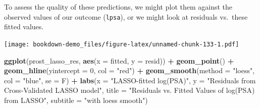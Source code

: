 \documentclass[]{book}
\newenvironment{Shaded}{\begin{snugshade}}{\end{snugshade}}
\newcommand{\KeywordTok}[1]{\textcolor[rgb]{0.13,0.29,0.53}{\textbf{#1}}}
\newcommand{\DataTypeTok}[1]{\textcolor[rgb]{0.13,0.29,0.53}{#1}}
\newcommand{\DecValTok}[1]{\textcolor[rgb]{0.00,0.00,0.81}{#1}}
\newcommand{\StringTok}[1]{\textcolor[rgb]{0.31,0.60,0.02}{#1}}
\newcommand{\OperatorTok}[1]{\textcolor[rgb]{0.81,0.36,0.00}{\textbf{#1}}}
\newcommand{\NormalTok}[1]{#1}
\theoremstyle{definition}
\theoremstyle{definition}
\theoremstyle{definition}
\theoremstyle{remark}
\begin{document}
To assess the quality of these predictions, we might plot them against
the observed values of our outcome (\texttt{lpsa}), or we might look at
residuals vs.~these fitted values.

\begin{Shaded}
\end{Shaded}

\texttt{[image: bookdown-demo\_files/figure-latex/unnamed-chunk-133-1.pdf]}

\begin{Shaded}
\begin{Highlighting}[]
\KeywordTok{ggplot}\NormalTok{(prost_lasso_res, }\KeywordTok{aes}\NormalTok{(}\DataTypeTok{x =}\NormalTok{ fitted, }\DataTypeTok{y =}\NormalTok{ resid)) }\OperatorTok{+}\StringTok{ }
\StringTok{    }\KeywordTok{geom_point}\NormalTok{() }\OperatorTok{+}\StringTok{ }
\StringTok{    }\KeywordTok{geom_hline}\NormalTok{(}\DataTypeTok{yintercept =} \DecValTok{0}\NormalTok{, }\DataTypeTok{col =} \StringTok{"red"}\NormalTok{) }\OperatorTok{+}
\StringTok{    }\KeywordTok{geom_smooth}\NormalTok{(}\DataTypeTok{method =} \StringTok{"loess"}\NormalTok{, }\DataTypeTok{col =} \StringTok{"blue"}\NormalTok{, }\DataTypeTok{se =}\NormalTok{ F) }\OperatorTok{+}
\StringTok{    }\KeywordTok{labs}\NormalTok{(}\DataTypeTok{x =} \StringTok{"LASSO-fitted log(PSA)"}\NormalTok{,}
         \DataTypeTok{y =} \StringTok{"Residuals from Cross-Validated LASSO model"}\NormalTok{,}
         \DataTypeTok{title =} \StringTok{"Residuals vs. Fitted Values of log(PSA) from LASSO"}\NormalTok{,}
         \DataTypeTok{subtitle =} \StringTok{"with loess smooth"}\NormalTok{)}
\end{Highlighting}
\end{Shaded}
\end{document}
